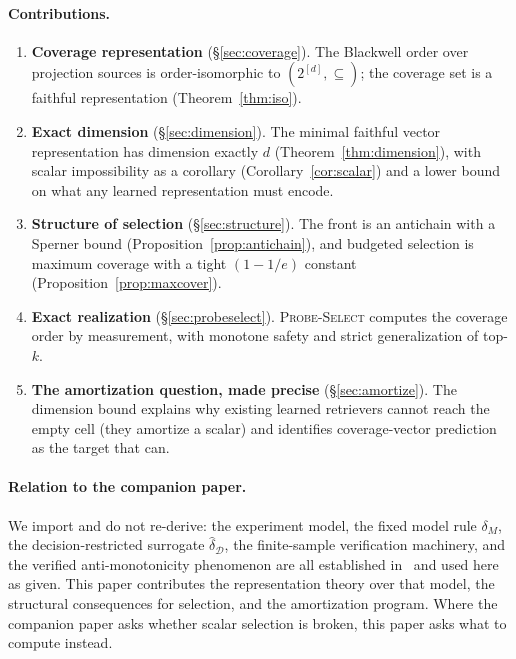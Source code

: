 \documentclass[11pt]{article}
\theoremstyle{plain}
\theoremstyle{definition}
\theoremstyle{remark}
\newcommand{\dhat}{\widehat{\delta}}
\newcommand{\Dcal}{\mathcal{D}}
\begin{document}
\paragraph{Contributions.}
\begin{enumerate}[leftmargin=1.6em,itemsep=3pt]
  \item \textbf{Coverage representation} (\S\ref{sec:coverage}). The Blackwell order over
    projection sources is order-isomorphic to $(2^{[d]},\subseteq)$; the coverage set is a faithful
    representation (Theorem~\ref{thm:iso}).
  \item \textbf{Exact dimension} (\S\ref{sec:dimension}). The minimal faithful vector
    representation has dimension exactly $d$ (Theorem~\ref{thm:dimension}), with scalar
    impossibility as a corollary (Corollary~\ref{cor:scalar}) and a lower bound on what any learned
    representation must encode.
  \item \textbf{Structure of selection} (\S\ref{sec:structure}). The front is an antichain with a
    Sperner bound (Proposition~\ref{prop:antichain}), and budgeted selection is maximum coverage
    with a tight $(1-1/e)$ constant (Proposition~\ref{prop:maxcover}).
  \item \textbf{Exact realization} (\S\ref{sec:probeselect}). \textsc{Probe-Select} computes the
    coverage order by measurement, with monotone safety and strict generalization of top-$k$.
  \item \textbf{The amortization question, made precise} (\S\ref{sec:amortize}). The dimension
    bound explains why existing learned retrievers cannot reach the empty cell (they amortize a
    scalar) and identifies coverage-vector prediction as the target that can.
\end{enumerate}

\paragraph{Relation to the companion paper.}
We import and do not re-derive: the experiment model, the fixed model rule $\delta_M$, the
decision-restricted surrogate $\dhat_{\Dcal}$, the finite-sample verification machinery, and the
verified anti-monotonicity phenomenon are all established in~\citet{companion} and used here as
given. This paper contributes the representation theory over that model, the structural
consequences for selection, and the amortization program. Where the companion paper asks whether
scalar selection is broken, this paper asks what to compute instead.
\end{document}
